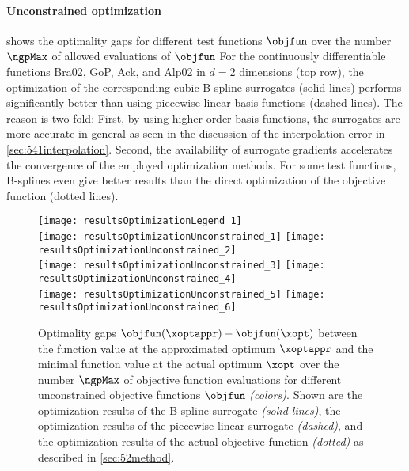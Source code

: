 \paragraph{Unconstrained optimization}

shows the optimality gaps for different test functions $\objfun$
over the number $\ngpMax$ of allowed evaluations of $\objfun$
For the continuously differentiable functions Bra02, GoP, Ack, and Alp02
in $d = 2$ dimensions (top row),
the optimization of the corresponding cubic B-spline surrogates (solid lines)
performs significantly better than using piecewise linear basis functions
(dashed lines).
The reason is two-fold:
First, by using higher-order basis functions, the surrogates are more accurate
in general as seen in the discussion of the interpolation error in
\cref{sec:541interpolation}.
Second, the availability of surrogate gradients accelerates the
convergence of the employed optimization methods.
For some test functions, B-splines even give better results than
the direct optimization of the objective function (dotted lines).

\begin{figure}
  \texttt{[image: resultsOptimizationLegend\_1]}\\[2mm]%
  \texttt{[image: resultsOptimizationUnconstrained\_1]}%
  \hfill%
  \texttt{[image: resultsOptimizationUnconstrained\_2]}%
  \\[2mm]%
  \texttt{[image: resultsOptimizationUnconstrained\_3]}%
  \hfill%
  \texttt{[image: resultsOptimizationUnconstrained\_4]}%
  \\[2mm]%
  \texttt{[image: resultsOptimizationUnconstrained\_5]}%
  \hfill%
  \texttt{[image: resultsOptimizationUnconstrained\_6]}%
  \caption[Optimality gaps for different objective functions (unconstrained)]{%
    Optimality gaps $\objfun(\xoptappr) - \objfun(\xopt)$ between
    the function value at the approximated optimum $\xoptappr$ and
    the minimal function value at the actual optimum $\xopt$
    over the number $\ngpMax$ of objective function evaluations
    for different unconstrained
    objective functions $\objfun$ \emph{(colors)}.
    Shown are the optimization results of the B-spline surrogate
    \emph{(solid lines)},
    the optimization results of the piecewise linear surrogate
    \emph{(dashed)}, and
    the optimization results of the actual objective function
    \emph{(dotted)} as described in \cref{sec:52method}.%
  }%
  \label{fig:resultsOptimizationUnconstrainedTestFunctions}%
\end{figure}

